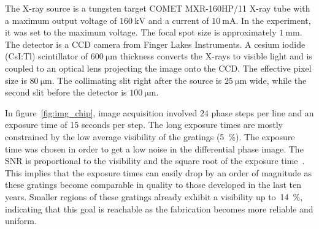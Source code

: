 The X-ray source is a tungsten target COMET MXR-160HP/11 X-ray tube with a maximum output
voltage of $\SI{160}{\kilo\volt}$ and a current of $\SI{10}{\milli\ampere}$. In the experiment, it was set to the
maximum voltage. The focal spot size is approximately
$\SI{1}{\milli\metre}$. The detector is a CCD camera from Finger Lakes
Instruments. A cesium iodide (CsI:Tl) scintillator of $\SI{600}{\micro
\metre}$ thickness converts the X-rays to visible light and is coupled to
an optical lens projecting the image onto the CCD\@. The effective pixel size
is $\SI{80}{\micro\metre}$. The collimating slit right after the source is 
$\SI{25}{\micro\metre}$ wide, while the second slit before the detector is
$\SI{100}{\micro\metre}$.

In figure~\ref{fig:img_chip}, image acquisition involved 24 phase steps per
line and an exposure time of 15 seconds per step. The long
exposure times are mostly constrained by the low average visibility of the
gratings (\SI{5}{\percent}). The exposure time was chosen in order to
get a low noise in the differential phase image. The \ac{SNR} is
proportional to the visibility and the square root of the exposure
time~\cite{Raupach2011}.
This implies that the exposure times can easily drop by an order of
magnitude as these gratings become comparable in quality to those developed
in the last ten years. 
Smaller regions of these gratings already exhibit a visibility up
to~\SI{14}{\percent}, indicating that this goal is reachable as the
fabrication becomes more reliable and uniform.
